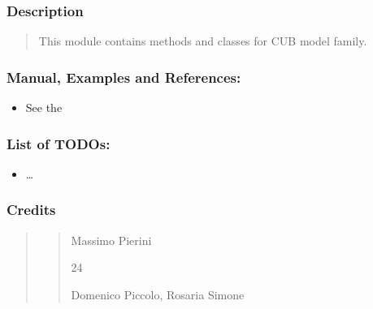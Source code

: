 \documentclass[letterpaper,10pt,english]{sphinxmanual}
\begin{document}
\subsubsection{Description}
\label{\detokenize{cubmods:description}}\begin{quote}

\sphinxAtStartPar
This module contains methods and classes
for CUB model family.
\end{quote}


\subsubsection{Manual, Examples and References:}
\label{\detokenize{cubmods:manual-examples-and-references}}\begin{itemize}
\item {} 
\sphinxAtStartPar
See the 

\end{itemize}


\subsubsection{List of TODOs:}
\label{\detokenize{cubmods:list-of-todos}}\begin{itemize}
\item {} 
\sphinxAtStartPar
…

\end{itemize}


\subsubsection{Credits}
\label{\detokenize{cubmods:credits}}\begin{quote}
\begin{quote}\begin{description}
\sphinxAtStartPar
Massimo Pierini

\sphinxhyphen{}24

\sphinxAtStartPar
Domenico Piccolo, Rosaria Simone

\sphinxAtStartPar
{}

\end{description}\end{quote}
\end{quote}
\end{document}
